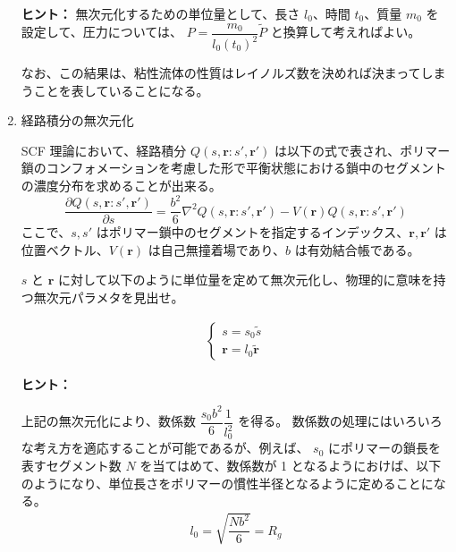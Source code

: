 \documentclass[uplatex,dvipdfmx,a4paper,11pt]{jsarticle}
\newcommand{\difp}[2]{\dfrac{\partial #1}{\partial #2}}
\begin{document}
\begin{enumerate}
\begin{itembox}[l]{{\bf ヒント：}}
無次元化するための単位量として、長さ $l_0$、時間 $t_0$、質量 $m_0$ を設定して、圧力については、 
$P = \dfrac{m_0}{l_0 (t_0)^2} \tilde{P}$ と換算して考えればよい。

なお、この結果は、粘性流体の性質はレイノルズ数を決めれば決まってしまうことを表していることになる。

\end{itembox}


\item 経路積分の無次元化 

SCF 理論において、経路積分 $Q(s, \bm{r}: s', \bm{r'})$ は以下の式で表され、ポリマー鎖のコンフォメーションを考慮した形で平衡状態における鎖中のセグメントの濃度分布を求めることが出来る。 
\begin{equation*}
\difp{Q(s, \bm{r}: s', \bm{r'})}{s} = \dfrac{b^2}{6} \nabla^2 Q(s, \bm{r}: s', \bm{r'}) - V(\bm{r}) Q(s, \bm{r}: s', \bm{r'})
\end{equation*}
ここで、$s, s'$ はポリマー鎖中のセグメントを指定するインデックス、$\bm{r}, \bm{r'}$ は位置ベクトル、$V(\bm{r})$ は自己無撞着場であり、$b$ は有効結合帳である。

$s$ と $\bm{r}$ に対して以下のように単位量を定めて無次元化し、物理的に意味を持つ無次元パラメタを見出せ。

\begin{align*}
\begin{cases}
s= s_0 \tilde{s} \\
\bm{r} = l_0 \tilde{\bm{r}}
\end{cases}
\end{align*}

\begin{itembox}[l]{{\bf ヒント：}}

上記の無次元化により、数係数 $\dfrac{s_0 b^2}{6} \dfrac{1}{l_0^2} $ を得る。
数係数の処理にはいろいろな考え方を適応することが可能であるが、例えば、
$s_0$ にポリマーの鎖長を表すセグメント数 $N$ を当てはめて、数係数が 1 となるようにおけば、以下のようになり、単位長さをポリマーの慣性半径となるように定めることになる。
\begin{align*}
l_0 = \sqrt{\dfrac{N b^2}{6}} = R_g
\end{align*}

\end{itembox}

\end{enumerate}

\newpage
\end{document}
